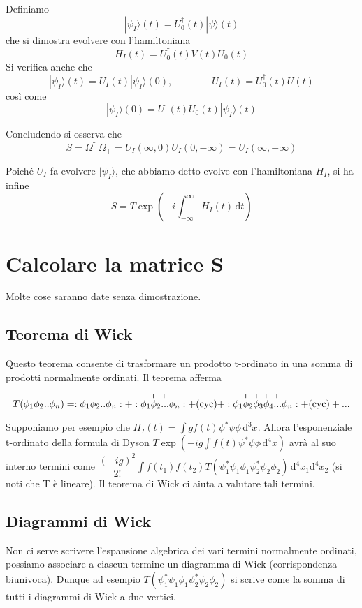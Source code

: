 \documentclass[]{article}
\newcommand{\ket}[1]{|#1\rangle}
\newcommand{\dd}{\mathrm{d}}
\begin{document}
Definiamo
\[ \ket{\psi_I}(t) = U_0^\dagger(t) \ket{\psi}(t) \]
che si dimostra evolvere con l'hamiltoniana
\[ H_I(t) = U_0^\dagger(t) V(t) U_0(t) \]
Si verifica anche che
\[ \ket{\psi_I}(t) = U_I(t) \ket{\psi_I}(0),\qquad\qquad U_I(t) = U_0^\dagger(t) U(t) \]
così come
\[ \ket{\psi_I}(0) = U^\dagger(t) U_0(t) \ket{\psi_I}(t) \]

Concludendo si osserva che
\[ S = \Omega_-^\dagger \Omega_+ = U_I(\infty, 0)U_I(0, -\infty) = U_I(\infty, -\infty) \]

Poiché $U_I$ fa evolvere $\ket{\psi_I}$, che abbiamo detto evolve con l'hamiltoniana $H_I$, si ha infine
\[ S = T \exp\left( -i\int_{-\infty}^\infty H_I(t)\, \dd t \right) \]

\section{Calcolare la matrice S}
Molte cose saranno date senza dimostrazione.
\subsection{Teorema di Wick}
Questo teorema consente di trasformare un prodotto t-ordinato in una somma di prodotti normalmente ordinati. Il teorema afferma

\[ T(\phi_1\phi_2 .. \phi_n) = :\phi_1\phi_2..\phi_n: + :\contraction{}{\phi}{{}_1}{\phi} \phi_1\phi_2...\phi_n : + \mathrm{(cyc)} + :\contraction{}{\phi}{{}_1}{\phi} \contraction{\phi_1\phi_2}{\phi}{{}_3}{\phi} \phi_1\phi_2\phi_3\phi_4...\phi_n : + \mathrm{(cyc)} + ... \]

Supponiamo per esempio che $H_I(t) = \int g f(t)\psi^*\psi\phi\,\dd^3 x$. Allora l'esponenziale t-ordinato della formula di Dyson $T \exp\left( -ig \int f(t) \psi^*\psi\phi\, \dd^4 x \right)$ avrà al suo interno termini come $\dfrac{(-ig)^2}{2!} \int f(t_1) f(t_2) T(\psi^*_1\psi_1\phi_1\psi^*_2\psi_2\phi_2)\,\dd^4 x_1 \dd^4 x_2$ (si noti che T è lineare). Il teorema di Wick ci aiuta a valutare tali termini.

\subsection{Diagrammi di Wick}
Non ci serve scrivere l'espansione algebrica dei vari termini normalmente ordinati, possiamo associare a ciascun termine un diagramma di Wick (corrispondenza biunivoca). Dunque ad esempio $T(\psi^*_1\psi_1\phi_1\psi^*_2\psi_2\phi_2)$ si scrive come la somma di tutti i diagrammi di Wick a due vertici.
\end{document}
